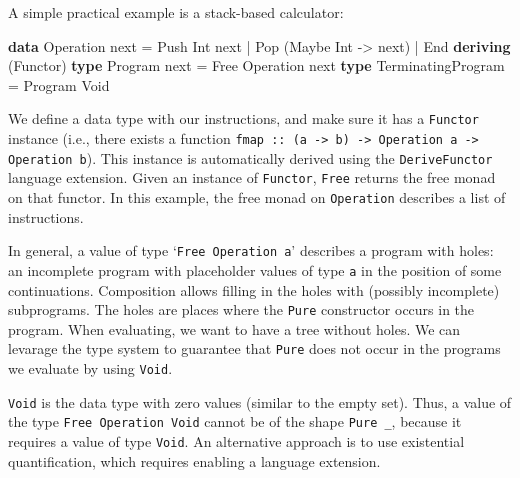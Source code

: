 \documentclass[runningheads,plain]{llncs}
\newenvironment{Shaded}{}{}
\newcommand{\KeywordTok}[1]{\textcolor[rgb]{0.00,0.44,0.13}{\textbf{#1}}}
\newcommand{\DataTypeTok}[1]{\textcolor[rgb]{0.56,0.13,0.00}{#1}}
\newcommand{\OtherTok}[1]{\textcolor[rgb]{0.00,0.44,0.13}{#1}}
\newcommand{\FunctionTok}[1]{\textcolor[rgb]{0.02,0.16,0.49}{#1}}
\newcommand{\NormalTok}[1]{#1}
\begin{document}
A simple practical example is a stack-based calculator:
\begin{Shaded}
\begin{Highlighting}[]
\KeywordTok{data} \DataTypeTok{Operation}\NormalTok{ next  }
    \FunctionTok{=} \DataTypeTok{Push} \DataTypeTok{Int}\NormalTok{ next}
    \FunctionTok{|} \DataTypeTok{Pop}\NormalTok{ (}\DataTypeTok{Maybe} \DataTypeTok{Int} \OtherTok{->}\NormalTok{ next) }
    \FunctionTok{|} \DataTypeTok{End}
    \KeywordTok{deriving}\NormalTok{ (}\DataTypeTok{Functor}\NormalTok{)  }
\KeywordTok{type} \DataTypeTok{Program}\NormalTok{ next }\FunctionTok{=} \DataTypeTok{Free} \DataTypeTok{Operation}\NormalTok{ next}
\KeywordTok{type} \DataTypeTok{TerminatingProgram} \FunctionTok{=} \DataTypeTok{Program} \DataTypeTok{Void}
\end{Highlighting}
\end{Shaded}

We define a data type with our instructions, and make sure it has a \texttt{Functor} instance (i.e., there exists a function \texttt{fmap :: (a -> b) -> Operation a -> Operation b}).
This instance is automatically derived using the \texttt{DeriveFunctor} language extension.
Given an instance of \texttt{Functor}, \texttt{Free} returns the free monad on that functor. 
 {In this example, the free monad on \texttt{Operation} describes a list of instructions.} 

In general, a value of type `\texttt{Free Operation a}' describes a program with holes: an incomplete program with placeholder values of type \texttt{a} in the position of some continuations. 
Composition allows filling in the holes with (possibly incomplete) subprograms. 
The holes are places where the \texttt{Pure} constructor occurs in the program. When evaluating, we want to have a tree without holes. We can levarage the type system to guarantee that \texttt{Pure}
does not occur in the programs we evaluate by using \texttt{Void}.

\texttt{Void} is the data type with zero values (similar to the empty set). 
Thus, a value of the type
\texttt{Free\ Operation\ Void} cannot be of the shape \texttt{Pure\ \_}, because it requires a value of type \texttt{Void}.
An alternative approach is to use existential quantification, which requires enabling a language extension.
\end{document}

